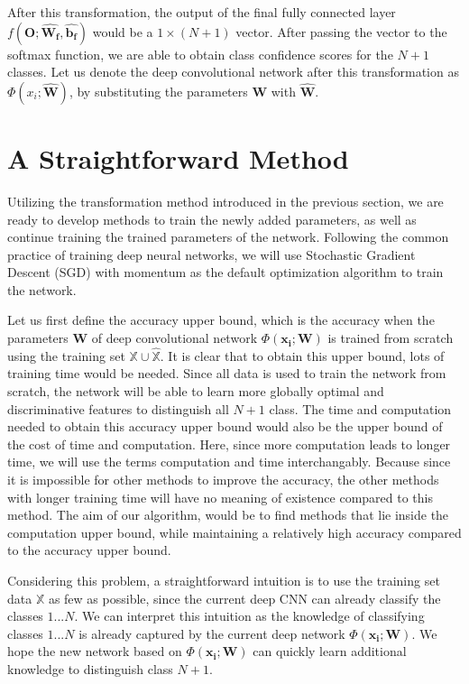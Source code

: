 After this transformation, the output of the final fully connected layer $f(\mathbf{O}; \hat{\mathbf{W_f}}, \hat{\mathbf{b_f}})$ would be a $1\times (N+1)$ vector. After passing the vector to the softmax function, we are able to obtain class confidence scores for the $N+1$ classes. Let us denote the deep convolutional network after this transformation as $\Phi(x_i; \hat{\mathbf{W}})$, by substituting the parameters $\mathbf{W}$ with $\hat{\mathbf{W}}$.


\section{A Straightforward Method}

Utilizing the transformation method introduced in the previous section, we are ready to develop methods to train the newly added parameters, as well as continue training the trained parameters of the network. Following the common practice of training deep neural networks, we will use Stochastic Gradient Descent\cite{he2016deep} (SGD) with momentum\cite{sutskever2013importance} as the default optimization algorithm to train the network.

Let us first define the accuracy upper bound, which is the accuracy when the parameters $\mathbf{W}$ of deep convolutional network $\Phi(\mathbf{x_i}; \mathbf{W})$ is trained from scratch using the training set $\mathbb{X}\cup \hat{\mathbb{X}}$. It is clear that to obtain this upper bound, lots of training time would be needed. Since all data is used to train the network from scratch, the network will be able to learn more globally optimal and discriminative features to distinguish all $N+1$ class. The time and computation needed to obtain this accuracy upper bound would also be the upper bound of the cost of time and computation. Here, since more computation leads to longer time, we will use the terms computation and time interchangably. Because since it is impossible for other methods to improve the accuracy, the other methods with longer training time will have no meaning of existence compared to this method. The aim of our algorithm, would be to find methods that lie inside the computation upper bound, while maintaining a relatively high accuracy compared to the accuracy upper bound.

Considering this problem, a straightforward intuition is to use the training set data $\mathbb{X}$ as few as possible, since the current deep CNN can already classify the classes $1...N$. We can interpret this intuition as the knowledge of classifying classes $1...N$ is already captured by the current deep network $\Phi(\mathbf{x_i}; \mathbf{W})$. We hope the new network based on $\Phi(\mathbf{x_i}; \mathbf{W})$ can quickly learn additional knowledge to distinguish class $N+1$. 


